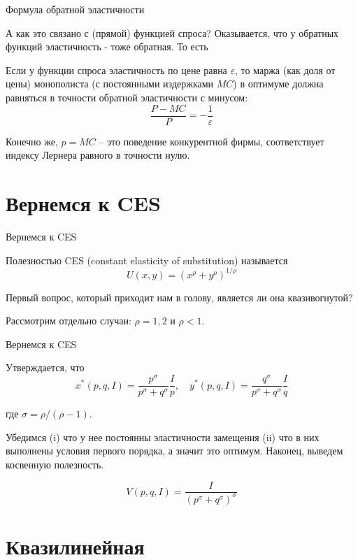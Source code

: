 \documentclass{beamer}
\begin{document}
\begin{frame}{Формула обратной эластичности}

А как это связано с (прямой) функцией спроса? Оказывается, что у обратных функций эластичность - тоже обратная. То есть 

\begin{lemma}
Если у функции спроса эластичность по цене равна $\varepsilon$, то маржа (как доля от цены) монополиста (с постоянными издержками $MC$) в оптимуме должна равняться в точности обратной эластичности с минусом:
$$\frac{P-MC}{P} = - \frac{1}{\varepsilon}$$
\end{lemma}
Конечно же, $p=MC$ – это поведение конкурентной фирмы, соответствует индексу Лернера равного в точности нулю.
\end{frame}

\section{Вернемся к CES}

\begin{frame}{Вернемся к CES}

\begin{definition}
Полезностью \alert{CES} (constant elasticity of substitution) называется
$$U(x,y) = (x^{\rho} + y^{\rho})^{1/\rho}$$
\end{definition}

Первый вопрос, который приходит нам в голову, является ли она квазивогнутой? 

Рассмотрим отдельно случаи: $\rho = 1, 2$ и $\rho < 1$.

\end{frame}

\begin{frame}{Вернемся к CES}

Утверждается, что
$$ x^{\ast}(p,q,I) = \frac{p^{\sigma}}{p^{\sigma} + q^{\sigma}} \frac{I}{p}, \quad y^{\ast}(p,q,I) = \frac{q^{\sigma}}{p^{\sigma} + q^{\sigma}} \frac{I}{q}$$

где $\sigma = \rho/(\rho-1)$.

Убедимся (i) что у нее постоянны эластичности замещения (ii) что в них выполнены условия первого порядка, а значит это оптимум. Наконец, выведем косвенную полезность.

$$V(p,q,I) = \frac{I}{(p^{\sigma}+q^{\sigma})^{\sigma}}$$
\end{frame}

\section{Квазилинейная}
\end{document}
